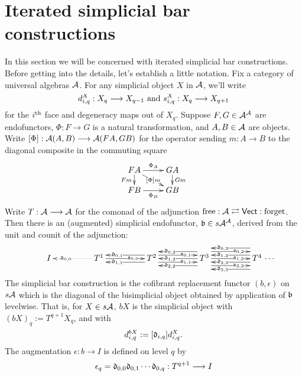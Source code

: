 \documentclass[11pt]{amsart}
\theoremstyle{plain}
\begin{document}
\section{Iterated simplicial bar constructions}\label{sec:ItSimpBar}
\newcommand{\algCat}{\calA}
\newcommand{\trip}[3]{{#1}_{\smash{#2}}^{\smash{#3}}}
In this section we will be concerned with iterated simplicial bar constructions. Before getting into the details, let's establish a little notation. Fix a category of universal algebras $\algCat$. For any simplicial object $X$ in $\algCat$, we'll write 
\[\trip{d}{i,q}{X}:X_q\to X_{q-1}\textup{\ and\ }\trip{s}{i,q}{X}:X_q\to X_{q+1}\]
for the $i^\textup{th}$ face and degeneracy maps out of $X_q$. Suppose $F,G\in\algCat^\algCat$ are endofunctors, $\Phi:F\to G$ is a natural transformation, and $A,B\in\algCat$ are objects. Write $[\Phi]:\algCat(A,B)\to\algCat(FA,GB)$ for the operator sending $m:A\to B$ to the diagonal composite in the commuting square
\[\xymatrix@R=4mm{
FA
\ar[r]^-{\Phi_A}
\ar[d]_-{Fm}
\ar[dr]|-{[\Phi]m}
&%
GA
\ar[d]^-{Gm}
\\%
FB
\ar[r]_-{\Phi_B}
&%
GB
}\]
Write $T:\algCat\to \algCat$ for the comonad of the adjunction $\textup{free}:\algCat\rightleftarrows\mathsf{Vect}:\textup{forget}$. Then there is an (augmented) simplicial endofunctor, $\frakb\in s\algCat^\algCat$, derived from the unit and counit of the adjunction:
\[\vcenter{
\def\labelstyle{\scriptstyle}
\xymatrix@C=1.65cm@1{
{\ I\,}
&
\,T^1\,
\ar@{..>}[l]|(.65){\frakd_{0,0}}
\ar[r]|(.65){\fraks_{0,0}}
&
\,T^2\,
\ar@<-1ex>[l]|(.65){\frakd_{0,1}}
\ar@<+1ex>[l]|(.65){\frakd_{1,1}}
\ar@<+1ex>[r]|(.65){\fraks_{0,1}}
\ar@<-1ex>[r]|(.65){\fraks_{1,1}}
&
\,T^3\,
\ar[l]|(.65){\frakd_{1,2}}
\ar@<-2ex>[l]|(.65){\frakd_{0,2}}
\ar@<+2ex>[l]|(.65){\frakd_{2,2}}
\ar[r]|(.65){\fraks_{1,2}}
\ar@<+2ex>[r]|(.65){\fraks_{0,2}}
\ar@<-2ex>[r]|(.65){\fraks_{2,2}}
&
\,T^4\,\makebox[0cm][l]{\,$\cdots $}
\ar@<-3ex>[l]|(.65){\frakd_{0,3}}
\ar@<-1ex>[l]|(.65){\frakd_{1,3}}
\ar@<+1ex>[l]|(.65){\frakd_{2,3}}
\ar@<+3ex>[l]|(.65){\frakd_{3,3}}
}}\]
The simplicial bar construction is the cofibrant replacement functor $(b,\epsilon)$ on $s\algCat$ which is the diagonal of the bisimplicial object obtained by application of $\mathfrak{b}$ levelwise. That is, for $X\in s\algCat$, $bX$ is the simplicial object with $(bX)_q:=T^{q+1}X_q$, and with
\[\trip{d}{i,q}{bX}:=[\frakd_{i,q}]\trip{d}{i,q}{X}.\]
The augmentation $\epsilon:b\to I$ is defined on level $q$ by 
\[\epsilon_q=\mathfrak{d}_{0,0}\mathfrak{d}_{0,1}\cdots \mathfrak{d}_{0,q}:T^{q+1}\longrightarrow I\]
\end{document}
